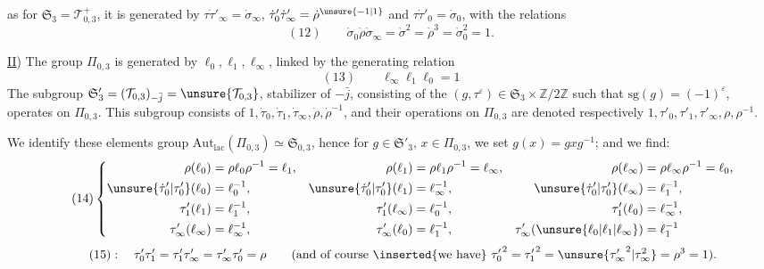 as for $\mathfrak S_3=\mathcal T_{0,3}^{+}$, it is generated by
$\tau\dot\tau'_\infty=\dot\sigma_\infty$, $\dot\tau'_0\dot\tau'_\infty=\dot\rho^{\unsure{-1|1}}$ and $\tau\dot\tau'_0=\dot\sigma_0$, with the relations
\[
(12)\qquad
\dot\sigma_0\dot\rho\dot\sigma_\infty=\dot\sigma^2=\dot\rho^3=\dot\sigma_0^2=1.
\]

\uline{II}) The group $\Pi_{0,3}$ is generated by $\ell_0,\ell_1,\ell_\infty$, linked by the generating relation
\[
(13)\qquad \ell_\infty \ell_1\ell_0=1
\]
The  subgroup 
$\mathfrak S'_3=(\mathcal T_{0,3})_{-\bar j}=\unsure{\mathcal T_{0,3}}$,
stabilizer of $-\bar j$, consisting of the $(g,\tau^\varepsilon)\in\mathfrak S_3\times\mathbb Z/2\mathbb Z$ such that $\mathrm{sg}(g)=(-1)^\varepsilon$, operates on $\Pi_{0,3}$.
This subgroup consists of $1,\dot\tau_0,\dot\tau_1,\dot\tau_\infty,\dot\rho,\dot\rho^{-1}$, and their operations on $\Pi_{0,3}$ are denoted respectively $1,\tau'_0,\tau'_1,\tau'_\infty,\rho,\rho^{-1}$.



\quad{}
We identify these elements   group
$\mathrm{Aut}_{\mathrm{lac}}(\Pi_{0,3})\simeq\mathfrak S_{0,3}$,
hence  for $g\in\mathfrak S'_3$, $x\in\Pi_{0,3}$, we set
$g(x)=gxg^{-1}$; and we find:
\[
\tag{14}
\left\{\begin{aligned}
\rho(\ell_0)&=\rho\ell_0\rho^{-1}=\ell_1,&
\rho(\ell_1)&=\rho\ell_1\rho^{-1}=\ell_\infty,&
\rho(\ell_\infty)&=\rho\ell_\infty\rho^{-1}=\ell_0,\\
\unsure{\dot\tau'_0|\tau'_0}(\ell_0)&=\ell_0^{-1},&
\unsure{\dot\tau'_0|\tau'_0}(\ell_1)&=\ell_\infty^{-1},&
\unsure{\dot\tau'_0|\tau'_0}(\ell_\infty)&=\ell_1^{-1},\\
\tau'_1(\ell_1)&=\ell_1^{-1},&
\tau'_1(\ell_\infty)&=\ell_0^{-1},&
\tau'_1(\ell_0)&=\ell_\infty^{-1},\\
\tau'_\infty(\ell_\infty)&=\ell_\infty^{-1},&
\tau'_\infty(\ell_0)&=\ell_1^{-1},&
\tau'_\infty(\unsure{\ell_0|\ell_1|\ell_\infty})&=\ell_1^{-1}
\end{aligned}\right.
\]
\[
\tag{15}
:\quad\tau'_0\tau'_1=\tau'_1\tau'_\infty=\tau'_\infty\tau'_0=\rho
\qquad\text{(and of course \inserted{we have} }{\tau'_0}^{2}={\tau'_1}^{2}=\unsure{{\tau'_\infty}^{2}|\tau_\infty^{2}}=\rho^3=1\text{).}
\]

